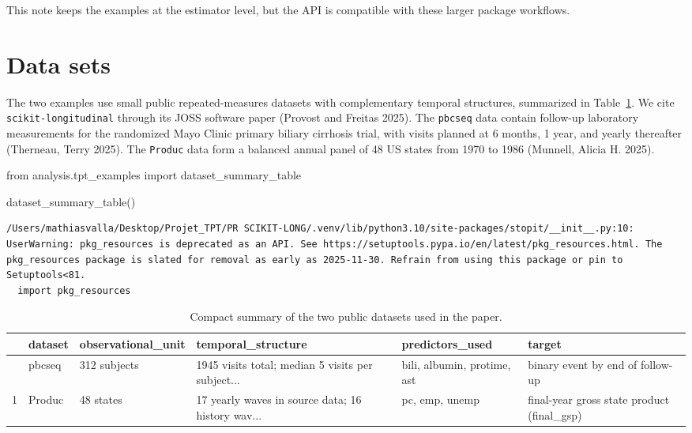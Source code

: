 \documentclass[
  letterpaper,
  DIV=11,
  numbers=noendperiod]{scrartcl}
\newenvironment{Shaded}{\begin{snugshade}}{\end{snugshade}}
\newcommand{\ImportTok}[1]{\textcolor[rgb]{0.00,0.46,0.62}{#1}}
\newcommand{\NormalTok}[1]{\textcolor[rgb]{0.00,0.23,0.31}{#1}}
\begin{document}
This note keeps the examples at the estimator level, but the API is
compatible with these larger package workflows.

\section{Data sets}\label{data-sets}

The two examples use small public repeated-measures datasets with
complementary temporal structures, summarized in
Table~\ref{tbl-dataset-summary}. We cite \texttt{scikit-longitudinal}
through its JOSS software paper (Provost and Freitas 2025). The
\texttt{pbcseq} data contain follow-up laboratory measurements for the
randomized Mayo Clinic primary biliary cirrhosis trial, with visits
planned at 6 months, 1 year, and yearly thereafter (Therneau, Terry
2025). The \texttt{Produc} data form a balanced annual panel of 48 US
states from 1970 to 1986 (Munnell, Alicia H. 2025).

\begin{Shaded}
\begin{Highlighting}[]
\ImportTok{from}\NormalTok{ analysis.tpt\_examples }\ImportTok{import}\NormalTok{ dataset\_summary\_table}

\NormalTok{dataset\_summary\_table()}
\end{Highlighting}
\end{Shaded}

\begin{verbatim}
/Users/mathiasvalla/Desktop/Projet_TPT/PR SCIKIT-LONG/.venv/lib/python3.10/site-packages/stopit/__init__.py:10: UserWarning: pkg_resources is deprecated as an API. See https://setuptools.pypa.io/en/latest/pkg_resources.html. The pkg_resources package is slated for removal as early as 2025-11-30. Refrain from using this package or pin to Setuptools<81.
  import pkg_resources
\end{verbatim}

\begin{longtable}[]{@{}llllll@{}}

\caption{\label{tbl-dataset-summary}Compact summary of the two public
datasets used in the paper.}

\tabularnewline

\toprule\noalign{}
& dataset & observational\_unit & temporal\_structure & predictors\_used
& target \\
\midrule\noalign{}
\endhead
\bottomrule\noalign{}
\endlastfoot
0 & pbcseq & 312 subjects & 1945 visits total; median 5 visits per
subject... & bili, albumin, protime, ast & binary event by end of
follow-up \\
1 & Produc & 48 states & 17 yearly waves in source data; 16 history
wav... & pc, emp, unemp & final-year gross state product (final\_gsp) \\

\end{longtable}
\end{document}
